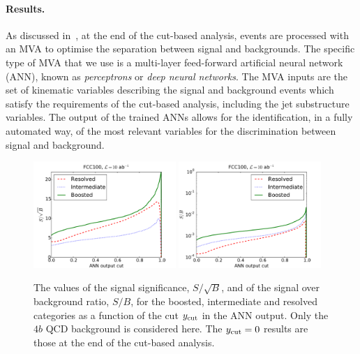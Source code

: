 \documentclass[a4paper,10pt]{article}
\begin{document}
\paragraph{Results.}
As discussed in~\cite{Behr:2015oqq}, at the end of the cut-based
analysis, events are processed with an MVA to optimise
the separation between signal and backgrounds.
%
The specific type of  MVA that we use is
a multi-layer feed-forward artificial neural network (ANN),
known as {\it perceptrons} or {\it deep neural networks}.
%
The MVA inputs are the set of kinematic variables describing the
signal and background
events which satisfy the requirements of the
cut-based analysis, including the jet substructure variables.
%
The output of the trained ANNs allows for the identification,
in a fully automated way,
of the most relevant variables for the discrimination between 
signal and background.


\begin{figure}[t]
\begin{center}
\includegraphics[width=0.48\textwidth]{plots/ssb_FCC100_4b.pdf}
\includegraphics[width=0.48\textwidth]{plots/sb_FCC100_4b.pdf}
\caption{\small
  The values of the signal significance, $S/\sqrt{B}$, and of the
  signal over background ratio, $S/B$, for the boosted, intermediate
  and resolved categories as a function of the cut
  $y_{\rm cut}$ in the ANN output.
  Only the $4b$ QCD background is considered here.
  The $y_{\rm cut}=0$
  results are those at the end of the cut-based
  analysis. 
}
\label{fig:sb_mva}
\end{center}
\end{figure}
\end{document}
